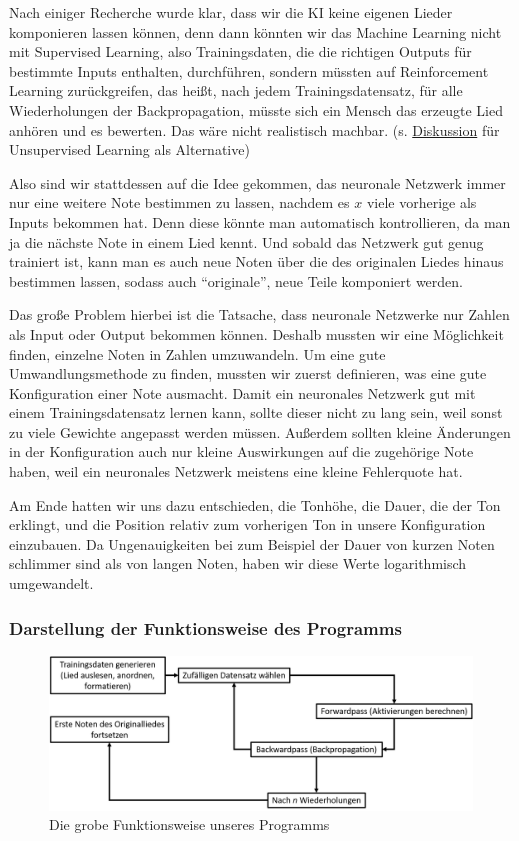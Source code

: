 \documentclass[11pt, a4paper, ngerman]{article}
\begin{document}
	Nach einiger Recherche wurde klar, dass wir die KI keine eigenen Lieder komponieren lassen können, denn dann könnten wir das Machine Learning nicht mit Supervised Learning, also Trainingsdaten, die die richtigen Outputs für bestimmte Inputs enthalten, durchführen, sondern müssten auf Reinforcement Learning zurückgreifen, das heißt, nach jedem Trainingsdatensatz, für alle Wiederholungen der Backpropagation, müsste sich ein Mensch das erzeugte Lied anhören und es bewerten. Das wäre nicht realistisch machbar. (s. \hyperref[Diskussion]{Diskussion} für Unsupervised Learning als Alternative)
	
	Also sind wir stattdessen auf die Idee gekommen, das neuronale Netzwerk immer nur eine weitere Note bestimmen zu lassen, nachdem es $x$ viele vorherige als Inputs bekommen hat. Denn diese könnte man automatisch kontrollieren, da man ja die nächste Note in einem Lied kennt. Und sobald das Netzwerk gut genug trainiert ist, kann man es auch neue Noten über die des originalen Liedes hinaus bestimmen lassen, sodass auch \enquote{originale}, neue Teile komponiert werden.
	
	Das große Problem hierbei ist die Tatsache, dass neuronale Netzwerke nur Zahlen als Input oder Output bekommen können. Deshalb mussten wir eine Möglichkeit finden, einzelne Noten in Zahlen umzuwandeln. Um eine gute Umwandlungsmethode zu finden, mussten wir zuerst definieren, was eine gute Konfiguration einer Note ausmacht. Damit ein neuronales Netzwerk gut mit einem Trainingsdatensatz lernen kann, sollte dieser nicht zu lang sein, weil sonst zu viele Gewichte angepasst werden müssen. Außerdem sollten kleine Änderungen in der Konfiguration auch nur kleine Auswirkungen auf die zugehörige Note haben, weil ein neuronales Netzwerk meistens eine kleine Fehlerquote hat.
	
	Am Ende hatten wir uns dazu entschieden, die Tonhöhe, die Dauer, die der Ton erklingt, und die Position relativ zum vorherigen Ton in unsere Konfiguration einzubauen. Da Ungenauigkeiten bei zum Beispiel der Dauer von kurzen Noten schlimmer sind als von langen Noten, haben wir diese Werte logarithmisch umgewandelt.
		
		\subsubsection{Darstellung der Funktionsweise des Programms}
		\begin{figure}[h]
			\includegraphics[width=\linewidth]{"pictures/program_schematic.png"}
			\caption{Die grobe Funktionsweise unseres Programms} \label{fig:program}
		\end{figure}
\end{document}
